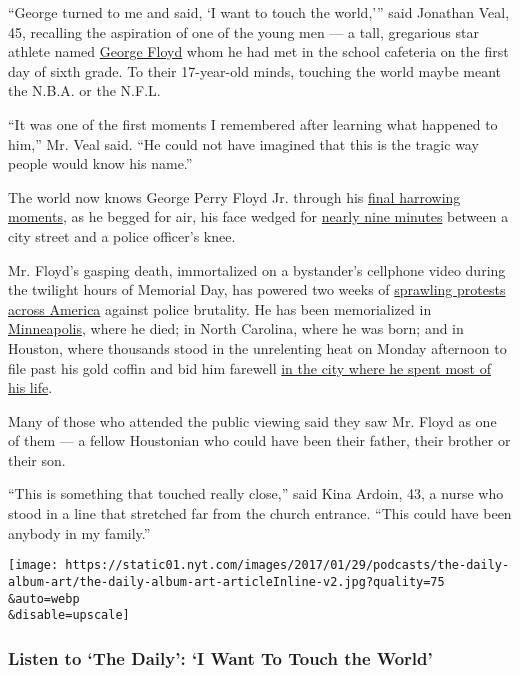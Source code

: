 ``George turned to me and said, `I want to touch the world,''' said
Jonathan Veal, 45, recalling the aspiration of one of the young men ---
a tall, gregarious star athlete named
\href{https://www.nytimes.com/2020/06/10/podcasts/the-daily/george-floyd-protests-funeral.html}{George
Floyd} whom he had met in the school cafeteria on the first day of sixth
grade. To their 17-year-old minds, touching the world maybe meant the
N.B.A. or the N.F.L.

``It was one of the first moments I remembered after learning what
happened to him,'' Mr. Veal said. ``He could not have imagined that this
is the tragic way people would know his name.''

The world now knows George Perry Floyd Jr. through his
\href{https://www.nytimes.com/2020/05/29/us/derek-chauvin-george-floyd-worked-together.html}{final
harrowing moments}, as he begged for air, his face wedged for
\href{https://www.nytimes.com/2020/05/31/us/george-floyd-investigation.html}{nearly
nine minutes} between a city street and a police officer's knee.

Mr. Floyd's gasping death, immortalized on a bystander's cellphone video
during the twilight hours of Memorial Day, has powered two weeks of
\href{https://www.nytimes.com/news-event/george-floyd-protests-minneapolis-new-york-los-angeles}{sprawling
protests across America} against police brutality. He has been
memorialized in
\href{https://www.nytimes.com/2020/07/29/us/george-floyd-memorial.html}{Minneapolis},
where he died; in North Carolina, where he was born; and in Houston,
where thousands stood in the unrelenting heat on Monday afternoon to
file past his gold coffin and bid him farewell
\href{https://www.nytimes.com/2020/06/08/us/george-floyd-viewing-funeral-houston-unrest.html}{in
the city where he spent most of his life}.

Many of those who attended the public viewing said they saw Mr. Floyd as
one of them --- a fellow Houstonian who could have been their father,
their brother or their son.

``This is something that touched really close,'' said Kina Ardoin, 43, a
nurse who stood in a line that stretched far from the church entrance.
``This could have been anybody in my family.''

\texttt{[image: https://static01.nyt.com/images/2017/01/29/podcasts/the-daily-album-art/the-daily-album-art-articleInline-v2.jpg?quality=75\\\&auto=webp\\\&disable=upscale]}

\hypertarget{listen-to-the-daily-i-want-to-touch-the-world}{%
\subsubsection{Listen to `The Daily': `I Want To Touch the
World'}\label{listen-to-the-daily-i-want-to-touch-the-world}}

